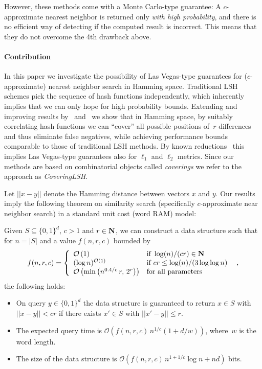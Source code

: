 \documentclass[prodmode,acmtalg]{acmsmall}
\newcommand{\Osymbol}{{\mathcal O}}
\newcommand{\BO}[1]{\Osymbol\left(#1\right)}
\begin{document}
However, these methods come with a Monte Carlo-type guarantee:
A $c$-approximate nearest neighbor is returned only \emph{with high probability}, and there is no efficient way of detecting if the computed result is incorrect.
This means that they do not overcome the 4th drawback above.

\medskip

\paragraph{Contribution}
In this paper we investigate the possibility of Las Vegas-type guarantees for ($c$-approximate) nearest neighbor search in Hamming space.
Traditional LSH schemes pick the sequence of hash functions independently, 
which inherently implies that we can only hope for high probability bounds.
Extending and improving results by~\cite{greene1994multi} and~\cite{Arasu_VLDB06} we show that in Hamming space, by suitably correlating hash functions we can ``cover'' all possible positions of~$r$ differences and thus eliminate false negatives, while achieving performance bounds comparable to those of traditional LSH methods.
By known reductions~\cite{DBLP:conf/stoc/Indyk07} this implies Las Vegas-type guarantees also for $\ell_1$ and $\ell_2$ metrics.
Since our methods are based on combinatorial objects called \emph{coverings} we refer to the approach as \emph{CoveringLSH}.

\medskip

Let $||x-y||$ denote the Hamming distance between vectors $x$ and $y$.
Our results imply the following theorem on similarity search (specifically $c$-approximate near neighbor search) in a standard unit cost (word RAM) model:

\begin{theorem}\label{thm:RAM}
Given $S\subseteq \{0,1\}^d$, $c>1$ and $r\in {\bf N}$, we can construct a data structure such that for $n=|S|$ and a value $f(n,r,c)$ bounded by
		 $$f(n,r,c) = \left\{ \begin{array}{ll}
 \BO{1} & \text{if } \log(n)/(cr)\in {\bf N}\\
 (\log n)^{\BO{1}} & \text{if } cr \leq \log(n)/(3\log\log n)\\
 \BO{\min\left(n^{0.4/c}\, r ,\, 2^r \right)} & \text{for all parameters}
 \end{array} \right. \enspace ,$$		 
	the following holds:
		\begin{itemize}
		\item On query  $y\in \{0,1\}^d$ the data structure is guaranteed to return $x\in S$ with $||x-y|| < cr$ if there exists $x'\in S$ with $||x'-y|| \leq r$.
		 \item The expected query time is $\BO{f(n,r,c)\, n^{1/c} (1+d/w)}$, where~$w$ is the word length.
		 \item The size of the data structure is $\BO{f(n,r,c)\, n^{1+1/c}\log n + nd}$ bits.
		\end{itemize}
\end{theorem}
\end{document}
